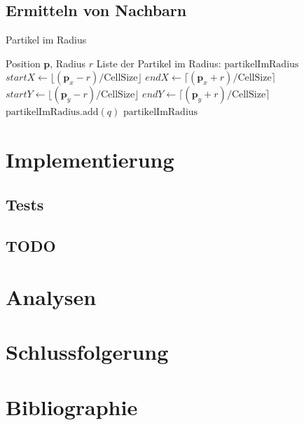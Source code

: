 \documentclass[a4paper, 12pt]{article}
\begin{document}
\subsection{Ermitteln von Nachbarn}
\begin{algorithm}[H]
    \caption{Partikel im Radius}
    \begin{algorithmic}[1]
		\Require Position $\mathbf{p}$, Radius $r$
        \Ensure Liste der Partikel im Radius: $\text{partikelImRadius}$
        \State $startX \leftarrow \lfloor (\mathbf{p}_x - r) / \text{CellSize} \rfloor$
        \State $endX \leftarrow \lceil (\mathbf{p}_x + r) / \text{CellSize} \rceil$
        \State $startY \leftarrow \lfloor (\mathbf{p}_y - r) / \text{CellSize} \rfloor$
        \State $endY \leftarrow \lceil (\mathbf{p}_y + r) / \text{CellSize} \rceil$
                            \State $\text{partikelImRadius}.\text{add}(q)$
                        \EndIf
                    \EndFor
                \EndIf
            \EndFor
        \EndFor
        \Return $\text{partikelImRadius}$
    \end{algorithmic}
\end{algorithm}

\section{Implementierung} \label{section_5}

\subsection{Tests}

\subsection{TODO}

\section{Analysen} \label{section_6}

\section{Schlussfolgerung}

\section{Bibliographie}
\end{document}
